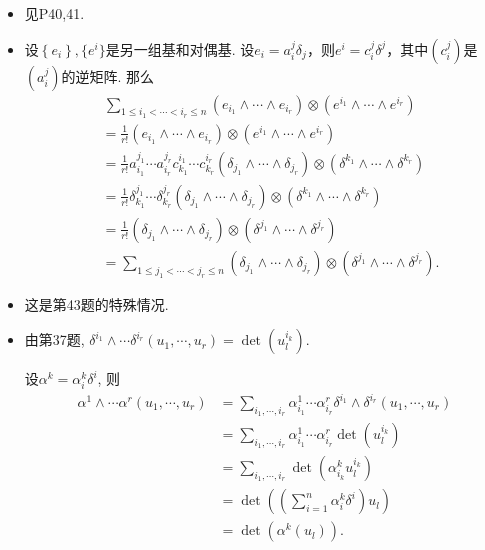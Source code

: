 \begin{itemize}
    \item[37.]
    见P40,41.

    \item[38.] 设$\left\{ e_i \right\},\{ e^i \}$是另一组基和对偶基.
    设$e_i=a_i^j \delta_j$，则$e^i=c_i^j \delta^j$，其中$(c_i^j)$是$(a_i^j)$的逆矩阵.
    那么
        \begin{align*}
            & \, \sum_{1\leq i_1< \cdots <i_r \leq n} \left( e_{i_1}\wedge \cdots \wedge e_{i_r} \right) \otimes \left( e^{i_1} \wedge \cdots \wedge e^{i_r} \right)\\
            & = \frac{1}{r!} \left( e_{i_1}\wedge \cdots \wedge e_{i_r} \right) \otimes \left( e^{i_1} \wedge \cdots \wedge e^{i_r} \right)\\
            & = \frac{1}{r!} a_{i_1}^{j_1} \cdots a_{i_r}^{j_r} c_{k_1}^{i_1} \cdots c_{k_r}^{i_r}\left( \delta_{j_1}\wedge \cdots \wedge \delta_{j_r} \right)\otimes\left( \delta^{k_1}\wedge \cdots \wedge \delta^{k_r} \right)\\
            & = \frac{1}{r!} \delta_{k_1}^{j_1} \cdots \delta_{k_r}^{j_r} \left( \delta_{j_1}\wedge \cdots \wedge \delta_{j_r} \right)\otimes\left( \delta^{k_1}\wedge \cdots \wedge \delta^{k_r} \right)\\
            & = \frac{1}{r!} \left( \delta_{j_1}\wedge \cdots \wedge \delta_{j_r} \right)\otimes\left( \delta^{j_1}\wedge \cdots \wedge \delta^{j_r} \right)\\
            & = \sum_{1\leq j_1< \cdots <j_r \leq n} \left( \delta_{j_1}\wedge \cdots \wedge \delta_{j_r} \right) \otimes \left( \delta^{j_1} \wedge \cdots \wedge \delta^{j_r} \right).
        \end{align*}

    \item[39.] 这是第43题的特殊情况.


	\item[41.] 由第37题, $\delta^{i_1} \wedge \cdots \delta^{i_r}(u_1,\cdots,u_r)=\det(u_l^{i_k})$.\par
	
	设$\alpha^k=\alpha^k_i\delta^i$, 则
		\begin{align*}
		\alpha^1\wedge\cdots\alpha^r(u_1,\cdots,u_r)
		&=\sum\limits_{i_1,\cdots,i_r}\alpha^1_{i_1}\cdots\alpha^r_{i_r}\delta^{i_1}\wedge \delta^{i_r}(u_1,\cdots,u_r)\\
		&=\sum\limits_{i_1,\cdots,i_r}\alpha^1_{i_1}\cdots\alpha^r_{i_r}\det(u_l^{i_k})\\
		&=\sum\limits_{i_1,\cdots,i_r}\det(\alpha^k_{i_k}u_l^{i_k})\\
		&=\det((\sum\limits_{i=1}^n \alpha^k_i\delta^i)u_l)\\
		&=\det(\alpha^k(u_l)).
		\end{align*}
	

\end{itemize}
